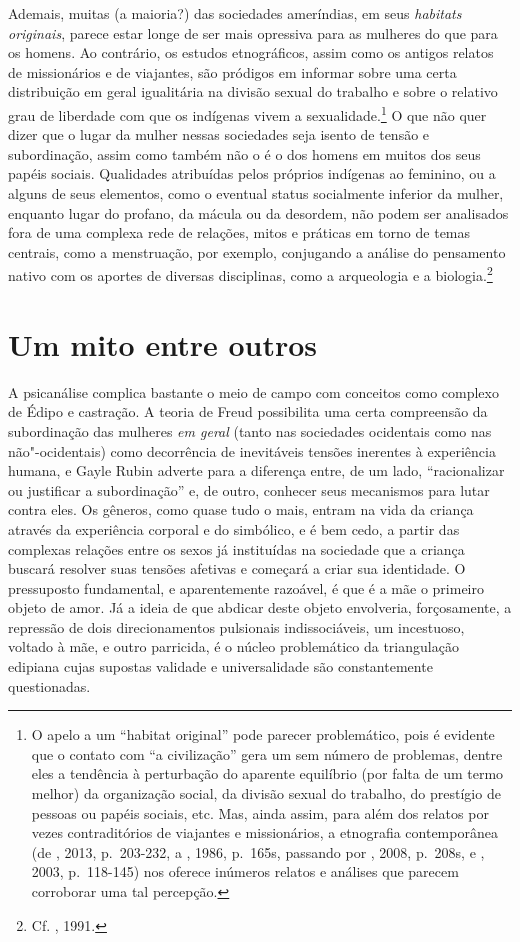Ademais, muitas (a maioria?) das sociedades ameríndias, em seus
\emph{habitats originais}, parece estar longe de ser mais opressiva para
as mulheres do que para os homens. Ao contrário, os estudos
etnográficos, assim como os antigos relatos de missionários e de
viajantes, são pródigos em informar sobre uma certa distribuição em
geral igualitária na divisão sexual do trabalho e sobre o relativo grau
de liberdade com que os indígenas vivem a sexualidade.\footnote{O apelo
  a um ``habitat original'' pode parecer problemático, pois é evidente
  que o contato com ``a civilização'' gera um sem número de problemas,
  dentre eles a tendência à perturbação do aparente equilíbrio (por
  falta de um termo melhor) da organização social, da divisão sexual do
  trabalho, do prestígio de pessoas ou papéis sociais, etc. Mas, ainda
  assim, para além dos relatos por vezes contraditórios de viajantes e
  missionários, a etnografia contemporânea (de , 2013,
  p.~203-232, a , 1986, p.~165s, passando por
  , 2008, p.~208s, e , 2003, p.~118-145) nos oferece
  inúmeros relatos e análises que parecem corroborar uma tal percepção.}
O que não quer dizer que o lugar da mulher nessas sociedades seja isento
de tensão e subordinação, assim como também não o é o dos homens em
muitos dos seus papéis sociais. Qualidades atribuídas pelos próprios
indígenas ao feminino, ou a alguns de seus elementos, como o eventual
status socialmente inferior da mulher, enquanto lugar do profano, da
mácula ou da desordem, não podem ser analisados fora de uma complexa
rede de relações, mitos e práticas em torno de temas centrais, como a
menstruação, por exemplo, conjugando a análise do pensamento nativo com
os aportes de diversas disciplinas, como a arqueologia e a
biologia.\footnote{Cf. , 1991.}

\section{Um mito entre outros}

A psicanálise complica bastante o meio de campo com conceitos como
complexo de Édipo e castração. A teoria de Freud possibilita uma certa
compreensão da subordinação das mulheres \emph{em geral} (tanto nas
sociedades ocidentais como nas não"-ocidentais) como decorrência de
inevitáveis tensões inerentes à experiência humana, e Gayle Rubin
adverte para a diferença entre, de um lado, ``racionalizar ou justificar
a subordinação'' e, de outro, conhecer seus mecanismos para lutar contra
eles. Os gêneros, como quase tudo o mais, entram na vida da criança
através da experiência corporal e do simbólico, e é bem cedo, a partir
das complexas relações entre os sexos já instituídas na sociedade que a
criança buscará resolver suas tensões afetivas e começará a criar sua
identidade. O pressuposto fundamental, e aparentemente razoável, é que é
a mãe o primeiro objeto de amor. Já a ideia de que abdicar deste objeto
envolveria, forçosamente, a repressão de dois direcionamentos pulsionais
indissociáveis, um incestuoso, voltado à mãe, e outro parricida, é o
núcleo problemático da triangulação edipiana cujas supostas validade e
universalidade são constantemente questionadas.

